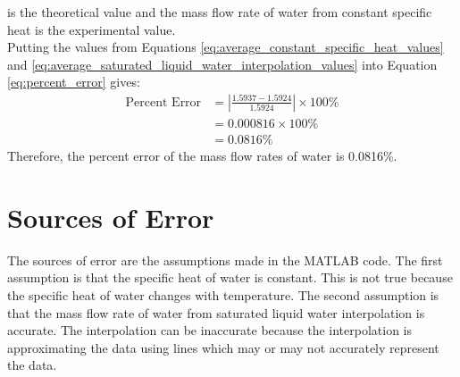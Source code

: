 \documentclass[12pt, titlepage]{article}
\begin{document}
is the theoretical value and the mass flow rate of water from constant specific
heat is the experimental value.\\[10pt]
Putting the values from Equations
\ref{eq:average_constant_specific_heat_values} and
\ref{eq:average_saturated_liquid_water_interpolation_values} into Equation
\ref{eq:percent_error} gives:
\begin{align}
  \text{Percent Error} &= \left| \frac{1.5937 - 1.5924}{1.5924}\right| \times 100\% \nonumber \\
  &= 0.000816 \times 100\% \nonumber \\
  &= 0.0816\%
  \label{eq:percent_error_values}
\end{align}
Therefore, the percent error of the mass flow rates of water is 0.0816\%.
\section{Sources of Error}
The sources of error are the assumptions made in the MATLAB code. The first
assumption is that the specific heat of water is constant. This is not true
because the specific heat of water changes with temperature. The second assumption
is that the mass flow rate of water from saturated liquid water interpolation
is accurate. The interpolation can be inaccurate because the interpolation is
approximating the data using lines which may or may not accurately represent the
data.
\end{document}
